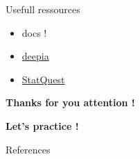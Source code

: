 \documentclass{irdbeamer}
\begin{document}
\begin{frame}{Usefull ressources}

\begin{itemize}
    \item {} docs !
    \item \href{https://www.youtube.com/@Deepia-ls2fo}{deepia}
    \item \href{https://www.youtube.com/@statquest}{StatQuest}
\end{itemize}
\end{frame}

\begin{frame}[plain]
    \Huge{\textbf{Thanks for you attention !}}
    
    \vfill
    
    \LARGE{\textbf{Let's practice !}}
\end{frame}

\appendix
\begin{frame}[allowframebreaks]{References}
    {\footnotesize \printbibliography[heading=none]}
\end{frame}
\end{document}
